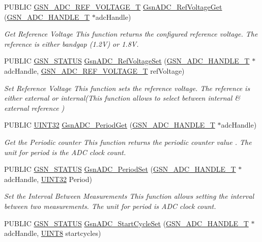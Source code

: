 \begin{DoxyCompactItemize}
PUBLIC \hyperlink{a00643_ga560e320e7f3b88d78bb8d8766a8c7445}{GSN\_\-ADC\_\-REF\_\-VOLTAGE\_\-T} \hyperlink{a00643_gae339df3cf9425d6e0b9f71aeee2cb245}{GsnADC\_\-RefVoltageGet} (\hyperlink{a00024}{GSN\_\-ADC\_\-HANDLE\_\-T} $\ast$adcHandle)
\begin{DoxyCompactList}\small\item\em Get Reference Voltage This function returns the configured reference voltage. The reference is either bandgap (1.2V) or 1.8V. \end{DoxyCompactList}\item 
PUBLIC \hyperlink{a00660_gada5951904ac6110b1fa95e51a9ddc217}{GSN\_\-STATUS} \hyperlink{a00643_gabd7bfb49431b859872e1c3becce3ce1a}{GsnADC\_\-RefVoltageSet} (\hyperlink{a00024}{GSN\_\-ADC\_\-HANDLE\_\-T} $\ast$adcHandle, \hyperlink{a00643_ga560e320e7f3b88d78bb8d8766a8c7445}{GSN\_\-ADC\_\-REF\_\-VOLTAGE\_\-T} refVoltage)
\begin{DoxyCompactList}\small\item\em Set Reference Voltage This function sets the reference voltage. The reference is either external or internal(This function allows to select between internal \& external reference ) \end{DoxyCompactList}\item 
PUBLIC \hyperlink{a00660_gae1e6edbbc26d6fbc71a90190d0266018}{UINT32} \hyperlink{a00643_ga0770bf992078873341c561c186b7dce0}{GsnADC\_\-PeriodGet} (\hyperlink{a00024}{GSN\_\-ADC\_\-HANDLE\_\-T} $\ast$adcHandle)
\begin{DoxyCompactList}\small\item\em Get the Periodic counter This function returns the periodic counter value . The unit for period is the ADC clock count. \end{DoxyCompactList}\item 
PUBLIC \hyperlink{a00660_gada5951904ac6110b1fa95e51a9ddc217}{GSN\_\-STATUS} \hyperlink{a00643_ga969dac4b6fcd50ed0cc861adcfe6c9d5}{GsnADC\_\-PeriodSet} (\hyperlink{a00024}{GSN\_\-ADC\_\-HANDLE\_\-T} $\ast$adcHandle, \hyperlink{a00660_gae1e6edbbc26d6fbc71a90190d0266018}{UINT32} Period)
\begin{DoxyCompactList}\small\item\em Set the Interval Between Measurements This function allows setting the interval between two measurements. The unit for period is ADC clock count. \end{DoxyCompactList}\item 
PUBLIC \hyperlink{a00660_gada5951904ac6110b1fa95e51a9ddc217}{GSN\_\-STATUS} \hyperlink{a00643_ga32c8846f78b01c95ae454f5532568163}{GsnADC\_\-StartCycleSet} (\hyperlink{a00024}{GSN\_\-ADC\_\-HANDLE\_\-T} $\ast$adcHandle, \hyperlink{a00660_gab27e9918b538ce9d8ca692479b375b6a}{UINT8} startcycles)

\end{DoxyCompactItemize}

